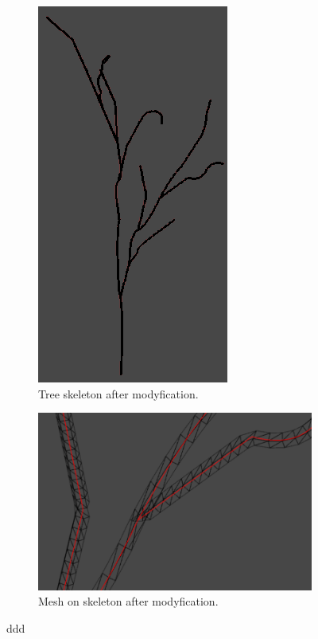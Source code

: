 \documentclass[b5paper,twoside,11pt]{article}
\begin{document}
\begin{figure}[!htbp]
\begin{subfigure}{.5\textwidth}
     \centering   
     \includegraphics[width=0.5\linewidth]{krzyweDrzewoMod} 
     \caption{Tree skeleton after modyfication. \label{unity.krzyweDrzewoMod}} 
   \end{subfigure}
\begin{subfigure}{.5\textwidth} \ContinuedFloat
  \centering  
  \includegraphics[width=1.0\linewidth]{krzyweDrzewoSiatka2} 
  \caption{Mesh on skeleton after modyfication. \label{unity.krzyweDrzewoSiatka}}
\end{subfigure} 
       \caption{ddd} \label{unity.direction} 
       \end{figure}
   \fi
\end{document}

